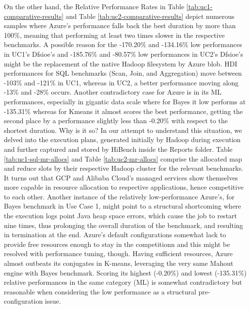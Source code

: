 \documentclass[review]{elsarticle}
\begin{document}
On the other hand, the Relative Performance Rates in Table \ref{tab:uc1-comparative-results} and Table \ref{tab:uc2-comparative-results} depict numerous samples where Azure's performance falls back the best duration by more than 100\%, meaning that performing at least two times slower in the respective benchmarks. A possible reason for the -170.20\% and -134.16\% low performances in UC1's Dfsioe's and -185.76\% and -80.57\% low performances in UC2's Dfsioe's might be the replacement of the native Hadoop filesystem by Azure blob. HDI performances for SQL benchmarks (Scan, Join, and Aggregation) move between -103\% and -121\% in UC1, whereas in UC2, a better performance moving along -13\% and -28\% occurs. Another contradictory case for Azure is in its ML performances, especially in gigantic data scale where for Bayes it low performs at -135.31\% whereas for Kmeans it almost scores the best performance, getting the second place by a performance slightly less than -0.20\% with respect to the shortest duration. Why is it so? In our attempt to understand this situation, we delved into the execution plans, generated initially by Hadoop during execution and further captured and stored by HiBench inside the Reports folder. Table \ref{tab:uc1-sql-mr-allocs} and Table \ref{tab:uc2-mr-allocs} comprise the allocated map and reduce slots by their respective Hadoop cluster for the relevant benchmarks. It turns out that GCP and Alibaba Cloud's managed services show themselves more capable in resource allocation to respective applications, hence competitive to each other. Another instance of the relatively low-performance Azure's, for Bayes benchmark in Use Case 1, might point to a structural shortcoming where the execution logs point Java heap space errors, which cause the job to restart nine times, thus prolonging the overall duration of the benchmark, and resulting in termination at the end. Azure's default configurations somewhat lack to provide free resources enough to stay in the competitionn and this might be resolved with performance tuning, though. Having sufficient resources, Azure almost outbeats its conjugates in K-means, leveraging the very same Mahout engine with Bayes benchmark. Scoring its highest (-0.20\%) and lowest (-135.31\%) relative performances in the same category (ML) is somewhat contradictory but reasonable when considering the low performance as a structural pre-configuration issue.
\end{document}
